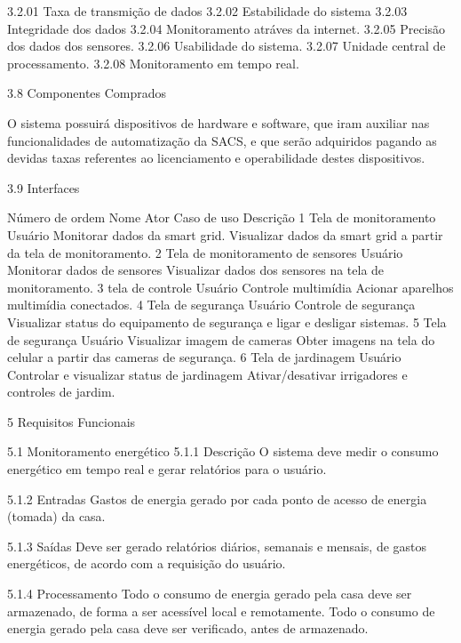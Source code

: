 3.2.01    Taxa de transmição de dados
3.2.02    Estabilidade do sistema
3.2.03    Integridade dos dados
3.2.04    Monitoramento atráves da internet.
3.2.05    Precisão dos dados dos sensores.
3.2.06    Usabilidade do sistema.
3.2.07    Unidade central de processamento.
3.2.08    Monitoramento em tempo real.

3.8     Componentes Comprados
    
O sistema possuirá dispositivos de hardware e software, que iram auxiliar nas funcionalidades de automatização da SACS, e que serão adquiridos pagando as devidas taxas referentes ao licenciamento e operabilidade destes dispositivos.



3.9     Interfaces


Número de ordem
Nome
Ator
Caso de uso
Descrição
1         
Tela de monitoramento
 Usuário
Monitorar dados da smart grid.
Visualizar dados da smart grid a partir da tela de monitoramento. 
2         
Tela de monitoramento de sensores
Usuário
Monitorar dados de sensores
Visualizar dados dos sensores na tela de monitoramento.
3         
tela de controle
Usuário
Controle multimídia
Acionar aparelhos multimídia conectados.
4         
 Tela de segurança
Usuário 
Controle de segurança 
Visualizar status do equipamento de segurança e ligar e desligar sistemas. 
5         
Tela de segurança 
Usuário 
Visualizar imagem de cameras 
Obter imagens na tela do celular a partir das cameras de segurança. 
6         
Tela de jardinagem 
Usuário 
Controlar e visualizar status de jardinagem 
Ativar/desativar irrigadores e controles de jardim. 










5 Requisitos Funcionais

5.1 Monitoramento energético
5.1.1 Descrição
O sistema deve medir o consumo energético em tempo real e gerar relatórios para o usuário.

5.1.2 Entradas
Gastos de energia gerado por cada ponto de acesso de energia (tomada) da casa.

5.1.3 Saídas
Deve ser gerado relatórios diários, semanais e mensais, de gastos energéticos,
de acordo com a requisição do usuário.

5.1.4 Processamento
Todo o consumo de energia gerado pela casa deve ser armazenado, de forma a ser acessível local e remotamente.
Todo o consumo de energia gerado pela casa deve ser verificado, antes de
armazenado.

